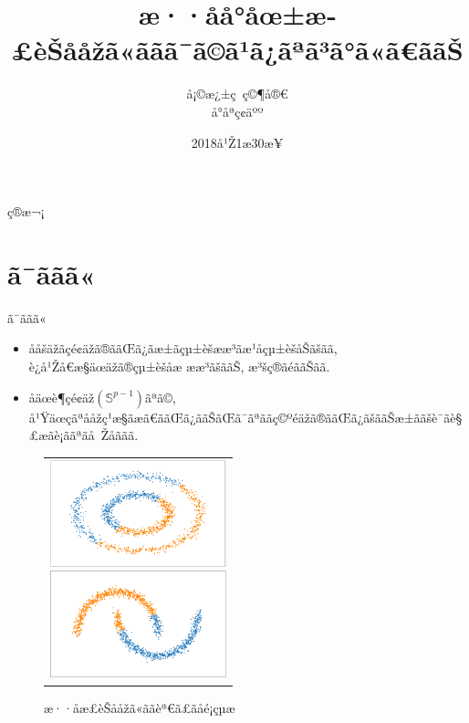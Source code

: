 \documentclass[dvipdfmx]{beamer} %
\title[ã¿ã€ãã«]{æ··åå°åœ±æ­£èŠååžã«ããã¯ã©ã¹ã¿ãªã³ã°ã«ã€ããŠ}
\author[çºè¡šèå]{å¡©æ¿±ç ç©¶å®€\\ å°åªç¢äºº}
\institute[æå±]{æ±äº¬çç§å€§å­Š\ å·¥å­Šéšçµå¶å·¥å­Šç§4å¹Ž\\å­Šç±çªå· 4414036}
\date[æ¥ä»]{2018å¹Ž1æ30æ¥}
\begin{document}
\begin{frame}[plain]
\titlepage
\end{frame}

\begin{frame}{ç®æ¬¡}
\tableofcontents
\end{frame}

\section{ã¯ããã«}
\begin{frame}{ã¯ããã«}

\begin{itemize}
\item 
ååšäžãçé¢äžã®ããŒã¿ãæ±ãçµ±èšææ³ãæ¹åçµ±èšå­Šãšãã, è¿å¹Žå€æ§äœäžã®çµ±èšåæ
ææ³ãšããŠ, æ³šç®ãéããŠãã.
\vspace{0.2cm}
\item 
åäœè¶çé¢äž$(\mathbb{S}^{p-1})$ãªã©, å¹Ÿäœçãªååžç¹æ§ãæã€ããŒã¿ããŠãŒã¯ãªããç©ºéäžã®ããŒã¿ãšããŠæ±ããšè¯ãè§£æãè¡ããªãå Žåããã.
\end{itemize}

\begin{figure}[H]
 \begin{tabular}{c}
 \begin{minipage}{0.5\hsize}
  \begin{center}
   \includegraphics[clip,height= 31mm]{data/sample_mixture_miss2.png}
  \end{center}
 \end{minipage}
 \begin{minipage}{0.5\hsize}
  \begin{center}
 \includegraphics[clip,height= 31mm]{data/sample_mixture_miss1.png}
  \end{center}
 \end{minipage}
\end{tabular}
\caption{æ··åæ­£èŠååžã«ããèª€ã£ãåé¡çµæ}
\end{figure}

\end{frame}
\end{document}
